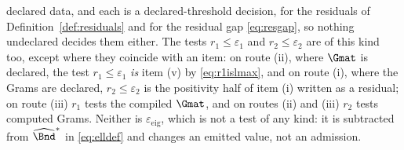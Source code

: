 \begin{definition}
\begin{enumerate}[label=(\alph*),leftmargin=2.2em]
  declared data, and each is a declared-threshold decision, for the residuals of
  Definition~\ref{def:residuals} and for the residual gap \eqref{eq:resgap},
  so nothing undeclared decides them either. The tests $r_1\le\varepsilon_1$
  and $r_2\le\varepsilon_2$ are of this kind too, except where they coincide
  with an item: on route (ii), where $\Gmat$ is declared, the test
  $r_1\le\varepsilon_1$ \emph{is} item (v) by \eqref{eq:r1islmax}, and on
  route (i), where the Grams are declared, $r_2\le\varepsilon_2$ is the
  positivity half of item (i) written as a residual; on route (iii) $r_1$
  tests the compiled $\Gmat$, and on routes (ii) and (iii) $r_2$ tests
  computed Grams. Neither is
  $\varepsilon_{\mathrm{eig}}$, which is not a test of any kind: it is
  subtracted from $\widehat\Bnd^{\ast}$ in \eqref{eq:elldef} and changes an
  emitted value, not an admission.
\end{enumerate}
\end{definition}
